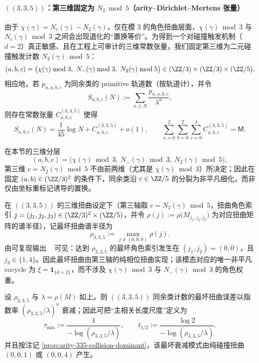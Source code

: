\label{subsec:arity-dirichlet-mertens-tensor-part2}
\paragraph{\texorpdfstring{$((3,3,5))$}{(3,3,5)}：第三维固定为 \texorpdfstring{$N_2\bmod 5$}{N2 mod 5}（arity--Dirichlet--Mertens 张量）}
由于 $\chi(\gamma)=N_e(\gamma)-N_2(\gamma)$，仅在模 $3$ 的角色扭曲层面，$\chi(\gamma)\bmod 3$ 与 $N_e(\gamma)\bmod 3$ 之间会出现退化的“置换等价”。为得到一个对碰撞触发机制（$d=2$）真正敏感、且在工程上可审计的三维常数张量，我们固定第三维为二元碰撞触发计数
\(
N_2(\gamma)\bmod 5
\)：
$$
(a,b,c)=\bigl(\chi(\gamma)\bmod 3,\ N_-(\gamma)\bmod 3,\ N_2(\gamma)\bmod 5\bigr)\in(\ZZ/3)\times(\ZZ/3)\times(\ZZ/5).
$$
相应地，若 $p_{n,a,b,c}$ 为同余类的 primitive 轨道数（按轨道计），并令
$$
S_{a,b,c}(N):=\sum_{n\le N}\frac{p_{n,a,b,c}}{\lambda^n},
$$
则存在常数张量 $C^{(3,3,5)}_{a,b,c}$ 使得
$$
S_{a,b,c}(N)=\frac{1}{45}\log N + C^{(3,3,5)}_{a,b,c}+o(1),
\qquad
\sum_{a=0}^2\sum_{b=0}^2\sum_{c=0}^4 C^{(3,3,5)}_{a,b,c}=\mathsf{M}.
$$
\begin{remark}\label{prop:arity-335-n2-nondegenerate}
在本节的三维分层
$$
(a,b,c)=\bigl(\chi(\gamma)\bmod 3,\ N_-(\gamma)\bmod 3,\ N_2(\gamma)\bmod 5\bigr),
$$
第三维 $c=N_2(\gamma)\bmod 5$ 不由前两维（尤其是 $\chi(\gamma)\bmod 3$）所决定；因此在固定 $(a,b)\in(\ZZ/3)^2$ 的条件下，同余类沿 $c\in\ZZ/5$ 的分裂为非平凡细化，而非仅由坐标重标记诱导的置换。
\end{remark}

\begin{remark}\label{prop:arity-335-collision-dominant}
在 \(((3,3,5))\) 的三维扭曲设定下（第三轴取 $c=N_2(\gamma)\bmod 5$，扭曲角色索引 $j=(j_1,j_2,j_3)\in(\ZZ/3)^2\times(\ZZ/5)$，并令
\(
\rho(j):=\rho\bigl(M_{j_1,j_2,j_3}\bigr)
\)
为对应扭曲矩阵的谱半径），记最坏扭曲谱半径为
$$
\rho_{3,3,5}:=\max_{j\neq (0,0,0)}\rho(j).
$$
由可复现输出
\verb||\ 
可见：达到 $\rho_{3,3,5}$ 的最坏角色索引发生在 $(j_1,j_2)=(0,0)$，且 $j_3\in\{1,4\}$。因此最坏扭曲由第三轴的纯相位扭曲实现；该模态对应的唯一非平凡 cocycle 为
\(
\xi=\mathbf{1}_{\{d=2\}}
\)，而不涉及 $\chi(\gamma)\bmod 3$ 与 $N_-(\gamma)\bmod 3$ 的角色权重。
\end{remark}

\begin{remark}\label{cor:arity-335-collision-mixing-scale}
设 \(\rho_{3,3,5}\) 与 \(\lambda=\rho(M)\) 如上。则 \(((3,3,5))\) 同余类计数的最坏扭曲误差以指数率
\(
(\rho_{3,3,5}/\lambda)^n
\)
衰减；因此可把“主相关长度尺度”定义为
$$
\tau_{\mathrm{mix}}:=\frac{1}{-\log(\rho_{3,3,5}/\lambda)},
\qquad
t_{1/2}:=\frac{\log 2}{-\log(\rho_{3,3,5}/\lambda)}.
$$
并且按注记 \ref{prop:arity-335-collision-dominant}，该最坏衰减模式由纯碰撞扭曲 $(0,0,1)$ 或 $(0,0,4)$ 产生。
\end{remark}

